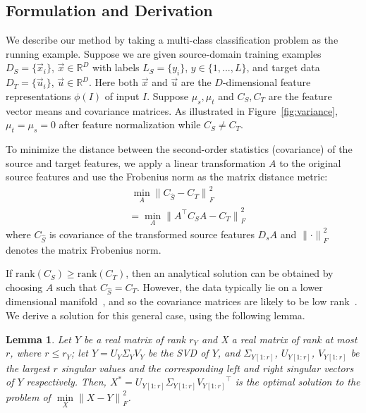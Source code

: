 \documentclass[letterpaper]{article}
\newtheorem{lemma}{Lemma}
\newcommand{\xSrc}{\vec{x}}
\newcommand{\ySrc}{y}
\newcommand{\xTar}{\vec{u}}
\begin{document}
\subsection{Formulation and Derivation}
We describe our method by taking a multi-class classification problem as the running example. Suppose we are given source-domain training examples $D_S=\{\xSrc_i\}$, $\xSrc\in\mathbb{R}^D$ with labels $L_S=\{\ySrc_i\}$, $\ySrc \in\{1,...,L\}$, and target data $D_T=\{\xTar_i\}$, $\xTar \in \mathbb{R}^D$. Here both $\xSrc$ and $\xTar$ are the $D$-dimensional feature representations $\phi(I)$ of input $I$. Suppose $\mu_s,\mu_t$ and $C_{S}, C_{T}$ are the feature vector means and covariance matrices. As illustrated in Figure~\ref{fig:variance}, $\mu_t=\mu_s=0$ after feature normalization while $C_{S} \neq C_{T}$.

To minimize the distance between the second-order statistics (covariance) of the source and target features, we apply a linear transformation $A$ to the original source features and use the Frobenius norm as the matrix distance metric:
      \begin{equation}
      \begin{aligned}
      &~\underset{A}{\min} {\| C_{\hat{S}} - C_{T} \|}^2_F\\
      &= \underset{A}{\min} {\| A^{\top}C_{S}A - C_{T} \|}^2_F
      \end{aligned}
      \label{eq:obj}
      \end{equation}
where $C_{\hat{S}}$ is covariance of the transformed source features $D_sA$ and ${\|\cdot\|}^2_F$ denotes the matrix Frobenius norm.

If $\mathrm{rank}(C_S) \geq \mathrm{rank}(C_T)$, then an analytical solution can be obtained by choosing $A$ such that $C_{\hat{S}}= C_{T}$.
However, the data typically lie on a lower dimensional manifold~\cite{outlooks,gfk,sasb}, and so the covariance matrices are likely to be low rank~\cite{who}. We derive a solution for this general case, using the following lemma.
\begin{lemma}\cite{SVT}
\label{lemma:svt}
Let $Y$ be a real matrix of rank $r_Y$ and X a real matrix of rank at most $r$, where ${r}\leqslant{r_Y}$; let $Y={U_Y}{\Sigma_Y}{V_Y}$ be the SVD of $Y$, and ${\Sigma_{Y[1:r]}}$, $U_{Y[1:r]}$, $V_{Y[1:r]}$ be the largest $r$ singular values and the corresponding left and right singular vectors of $Y$ respectively. Then, $X^{*} = U_{Y[1:r]}{\Sigma_{Y[1:r]}}{V_{Y[1:r]}}^{\top}$ is the optimal solution to the problem of $\underset{X}\min{\| X - Y \|}^2_F$.
\end{lemma}
\end{document}
